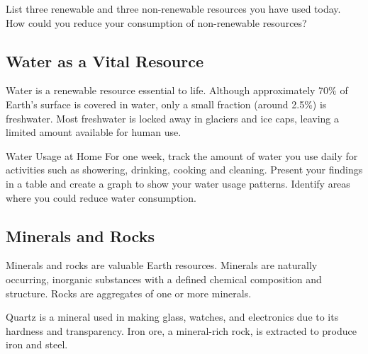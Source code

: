 \begin{stopandthink}
List three renewable and three non-renewable resources you have used today. How could you reduce your consumption of non-renewable resources?
\end{stopandthink}

\subsection{Water as a Vital Resource}

Water is a renewable resource essential to life. Although approximately 70\% of Earth's surface is covered in water, only a small fraction (around 2.5\%) is freshwater. Most freshwater is locked away in glaciers and ice caps, leaving a limited amount available for human use.

\begin{marginfigure}
\caption{Distribution of water on Earth.}
\end{marginfigure}


\begin{investigation}{Water Usage at Home}
For one week, track the amount of water you use daily for activities such as showering, drinking, cooking and cleaning. Present your findings in a table and create a graph to show your water usage patterns. Identify areas where you could reduce water consumption.
\end{investigation}

\subsection{Minerals and Rocks}

Minerals and rocks are valuable Earth resources. Minerals are naturally occurring, inorganic substances with a defined chemical composition and structure. Rocks are aggregates of one or more minerals.

\begin{marginfigure}
\caption{Examples of common minerals and their everyday uses.}
\end{marginfigure}

\begin{example}
Quartz is a mineral used in making glass, watches, and electronics due to its hardness and transparency. Iron ore, a mineral-rich rock, is extracted to produce iron and steel.
\end{example}

